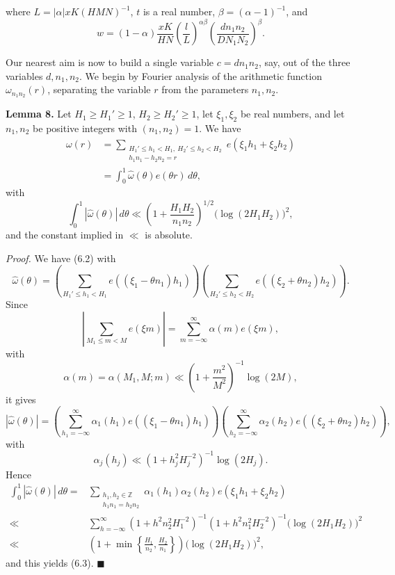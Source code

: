 \documentclass[10pt]{article}
\begin{document}
where $L=|\alpha|xK(HMN)^{-1}$, $t$ is a real number,
$\beta=(\alpha-1)^{-1}$, and
\[
w=(1-\alpha)\frac{xK}{HN}
 \left(\frac lL\right)^{\alpha\beta}
 \left(\frac{dn_1n_2}{DN_1N_2}\right)^\beta.
\]

Our nearest aim is now to build a single variable $c=dn_1n_2$, say, out
of the three variables $d,n_1,n_2$. We begin by Fourier analysis of the
arithmetic function $\omega_{n_1n_2}(r)$, separating the variable $r$ from
the parameters $n_1,n_2$.

\medskip
\noindent\textbf{Lemma 8.}
Let $H_1\ge H_1'\ge1$, $H_2\ge H_2'\ge1$, let $\xi_1,\xi_2$ be real
numbers, and let $n_1,n_2$ be positive integers with $(n_1,n_2)=1$.
We have
\begin{equation*}
\begin{aligned}
\omega(r)
 &=\sum_{\substack{H_1'\le h_1<H_1,\ H_2'\le h_2<H_2\\
                    h_1n_1-h_2n_2=r}}
   e(\xi_1h_1+\xi_2h_2)\\
 &=\int_0^1\widehat\omega(\theta)e(\theta r)\,d\theta,
\end{aligned}
\tag{6.2}
\end{equation*}
with
\begin{equation*}
 \int_0^1|\widehat\omega(\theta)|\,d\theta
 \ll\left(1+\frac{H_1H_2}{n_1n_2}\right)^{1/2}
       \bigl(\log(2H_1H_2)\bigr)^2,
\tag{6.3}
\end{equation*}
and the constant implied in $\ll$ is absolute.

\medskip
\noindent\textit{Proof.}
We have (6.2) with
\[
\widehat\omega(\theta)
 =\left(\sum_{H_1'\le h_1<H_1}e((\xi_1-\theta n_1)h_1)\right)
  \left(\sum_{H_2'\le h_2<H_2}e((\xi_2+\theta n_2)h_2)\right).
\]
Since
\[
\left|\sum_{M_1\le m<M}e(\xi m)\right|
 =\sum_{m=-\infty}^{\infty}\alpha(m)e(\xi m),
\]
with
\[
 \alpha(m)=\alpha(M_1,M;m)
 \ll\left(1+\frac{m^2}{M^2}\right)^{-1}\log(2M),
\]
it gives
\[
|\widehat\omega(\theta)|
 =\left(\sum_{h_1=-\infty}^{\infty}\alpha_1(h_1)
        e((\xi_1-\theta n_1)h_1)\right)
  \left(\sum_{h_2=-\infty}^{\infty}\alpha_2(h_2)
        e((\xi_2+\theta n_2)h_2)\right),
\]
with
\[
 \alpha_j(h_j)\ll(1+h_j^2H_j^{-2})^{-1}\log(2H_j).
\]
Hence
\[
\begin{aligned}
\int_0^1|\widehat\omega(\theta)|\,d\theta
={}&\sum_{\substack{h_1,h_2\in\mathbb Z\\h_1n_1=h_2n_2}}
 \alpha_1(h_1)\alpha_2(h_2)e(\xi_1h_1+\xi_2h_2)\\
\ll{}&\sum_{h=-\infty}^{\infty}
 (1+h^2n_2^2H_1^{-2})^{-1}
 (1+h^2n_1^2H_2^{-2})^{-1}
 \bigl(\log(2H_1H_2)\bigr)^2\\
\ll{}&\left(1+\min\left\{\frac{H_1}{n_2},\frac{H_2}{n_1}\right\}\right)
 \bigl(\log(2H_1H_2)\bigr)^2,
\end{aligned}
\]
and this yields (6.3). \(\blacksquare\)
\end{document}
